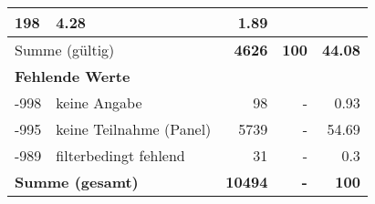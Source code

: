 \begin{longtable}{lXrrr}
       \num{198} &
       \num[round-mode=places,round-precision=2]{4,28} &
         \num[round-mode=places,round-precision=2]{1,89} \\
     \midrule
     \multicolumn{2}{l}{Summe (gültig)} &
       \textbf{\num{4626}} &
     \textbf{100} &
       \textbf{\num[round-mode=places,round-precision=2]{44,08}} \\
     \multicolumn{5}{l}{\textbf{Fehlende Werte}}\\
       -998 &
       keine Angabe &
         \num{98} &
        - &
         \num[round-mode=places,round-precision=2]{0,93} \\
       -995 &
       keine Teilnahme (Panel) &
         \num{5739} &
        - &
         \num[round-mode=places,round-precision=2]{54,69} \\
       -989 &
       filterbedingt fehlend &
         \num{31} &
        - &
         \num[round-mode=places,round-precision=2]{0,3} \\
     \midrule
     \multicolumn{2}{l}{\textbf{Summe (gesamt)}} &
          \textbf{\num{10494}} &
        \textbf{-} &
        \textbf{100} \\
     \bottomrule
     \end{longtable}
     
